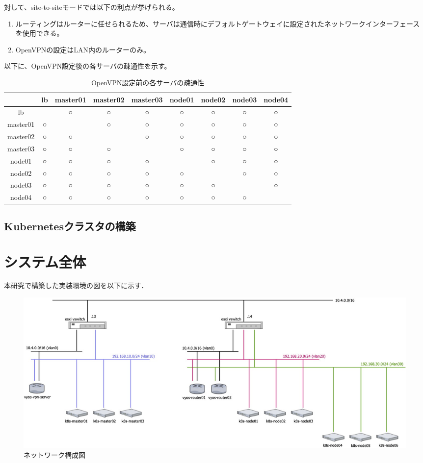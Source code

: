 対して、site-to-siteモードでは以下の利点が挙げられる。

\begin{enumerate}
  \item ルーティングはルーターに任せられるため、サーバは通信時にデフォルトゲートウェイに設定されたネットワークインターフェースを使用できる。
  \item OpenVPNの設定はLAN内のルーターのみ。
\end{enumerate}

以下に、OpenVPN設定後の各サーバの疎通性を示す。

\begin{table}[htb]
  \begin{center}
    \caption{OpenVPN設定前の各サーバの疎通性}
    \begin{tabular}{|c|c|c|c|c|c|c|c|c|} \hline
      & lb & master01 & master02 & master03 & node01 & node02 & node03 & node04 \\ \hline
      lb & \ & ○ & ○ & ○ & ○ & ○ & ○ & ○ \\ \hline
      master01 & ○ & \ & ○ & ○ & ○ & ○ & ○ & ○ \\ \hline
      master02 & ○ & ○ & \ & ○ & ○ & ○ & ○ & ○ \\ \hline
      master03 & ○ & ○ & ○ & \ & ○ & ○ & ○ & ○ \\ \hline
      node01 & ○ & ○ & ○ & ○ & \ & ○ & ○ & ○ \\ \hline
      node02 & ○ & ○ & ○ & ○ & ○ & \ & ○ & ○ \\ \hline
      node03 & ○ & ○ & ○ & ○ & ○ & ○ & \ & ○ \\ \hline
      node04 & ○ & ○ & ○ & ○ & ○ & ○ & ○ & \ \\ \hline
    \end{tabular}
  \end{center}
\end{table}

\subsection{Kubernetesクラスタの構築}

\section{システム全体}
\label{implementation:system}
本研究で構築した実装環境の図を以下に示す．

\begin{figure}[htbp]
  \begin{center}
    \includegraphics[width=\textwidth]{./figures/network-diagram.jpg}
    \caption{ネットワーク構成図}
  \end{center}
\end{figure}


